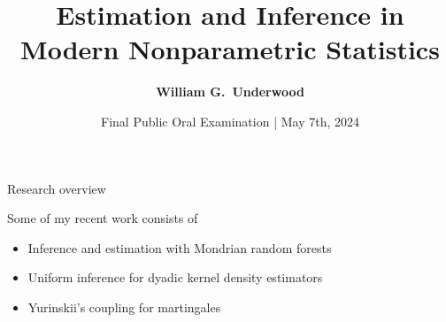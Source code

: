 \documentclass{beamer}
\title{
  Estimation and Inference in \\
  Modern Nonparametric Statistics%
  \vspace*{-2mm}
}
\author[shortname]{\textbf{William G.\ Underwood}}
\institute{
  Department of Operations Research and Financial Engineering \\
  Princeton University
}
\date{Final Public Oral Examination | May 7th, 2024}
\begin{document}
\NoHyper

\begin{frame}{}
  \titlepage
\end{frame}

\begin{frame}{Research overview}

  \vspace*{2mm}

  Some of my recent work consists of

  \begin{itemize}
    \item \alert{Inference and estimation with Mondrian random forests}
      \nocite{cattaneo2023inference}
    \item \alert{Uniform inference for dyadic kernel density estimators}
      \nocite{cattaneo2024uniform}
    \item Yurinskii's coupling for martingales
      \nocite{cattaneo2022yurinskii}
  \end{itemize}

\end{frame}
\end{document}

